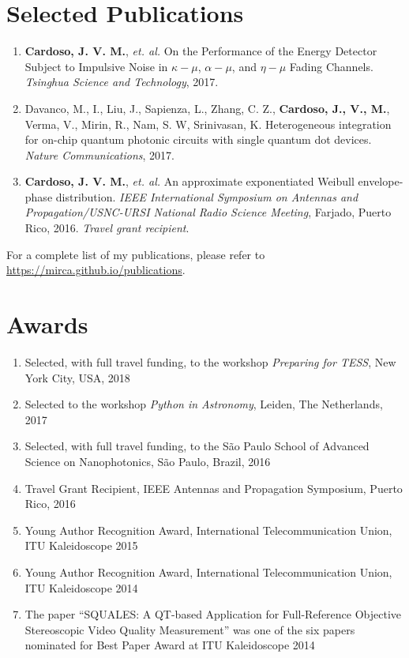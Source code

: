 \documentclass[10pt]{article}
\begin{document}
\begin{titlepage}
\section*{Selected Publications}
\begin{enumerate}
\item \textbf{Cardoso, J. V. M.}, \textit{et. al.} On the Performance of the Energy Detector Subject to Impulsive
Noise in $\kappa - \mu$, $\alpha - \mu$, and $\eta - \mu$ Fading Channels. \textit{Tsinghua Science and Technology}, 2017.
\item Davanco, M., I., Liu, J., Sapienza, L., Zhang, C. Z., \textbf{Cardoso, J., V., M.}, Verma, V., Mirin, R., Nam,
S. W, Srinivasan, K. Heterogeneous integration for on-chip quantum photonic circuits with single quantum dot devices.
\textit{Nature Communications}, 2017.
\item \textbf{Cardoso, J. V. M.}, \textit{et. al.} An approximate exponentiated Weibull envelope-phase distribution.
\textit{IEEE International Symposium on Antennas and Propagation/USNC-URSI National Radio Science Meeting}, Farjado, Puerto Rico, 2016.
\textit{Travel grant recipient}.
\end{enumerate}

For a complete list of my publications, please refer to \url{https://mirca.github.io/publications}.

\section*{Awards}
\begin{enumerate}
  \item Selected, with full travel funding, to the workshop \textit{Preparing for TESS}, New York City, USA, 2018
  \item Selected to the workshop \textit{Python in Astronomy}, Leiden, The Netherlands, 2017
  \item Selected, with full travel funding, to the S\~ao Paulo School of Advanced Science on Nanophotonics, S\~ao Paulo, Brazil, 2016
  \item Travel Grant Recipient, IEEE Antennas and Propagation Symposium, Puerto Rico, 2016
  \item Young Author Recognition Award, International Telecommunication Union, ITU Kaleidoscope 2015
  \item Young Author Recognition Award, International Telecommunication Union, ITU Kaleidoscope 2014
  \item The paper ``SQUALES: A QT-based Application for Full-Reference Objective Stereoscopic
      Video Quality Measurement'' was one of the six papers nominated for Best Paper Award at ITU Kaleidoscope 2014
\end{enumerate}


\end{titlepage}
\end{document}
